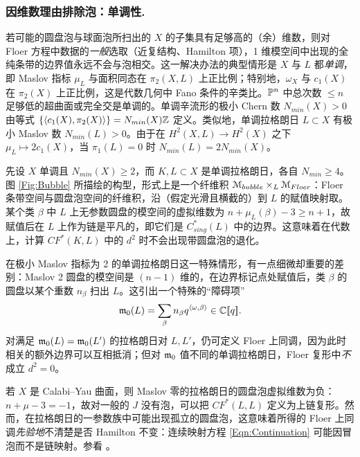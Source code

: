\subsubsection{因维数理由排除泡：单调性.\label{Sec:Monotone}} 若可能的圆盘泡与球面泡所扫出的 $X$ 的子集具有足够高的（余）维数，则对 Floer 方程中数据的\emph{一般}选取（近复结构、Hamilton 项），1 维模空间中出现的全纯条带的边界值永远不会与泡相交。这一解决办法的典型情形是 $X$ 与 $L$ 都\emph{单调}，即 Maslov 指标 $\mu_L$ 与面积同态在 $\pi_2(X,L)$ 上正比例；特别地，$\omega_X$ 与 $c_1(X)$ 在 $\pi_2(X)$ 上正比例，这是代数几何中 Fano 条件的辛类比。$\bP^n$ 中总次数 $\leq n$ 足够低的超曲面或完全交是单调的。单调辛流形的极小 Chern 数 $N_{min}(X)>0$ 由等式 $\{\langle c_1(X), \pi_2(X)\rangle\} = N_{min}(X)\bZ$ 定义。类似地，单调拉格朗日 $L\subset X$ 有极小 Maslov 数 $N_{min}(L)>0$。由于在 $H^2(X,L)\rightarrow H^2(X)$ 之下 $\mu_L \mapsto 2c_1(X)$，当 $\pi_1(L)=0$ 时 $N_{min}(L) = 2N_{min}(X)$。

先设 $X$ 单调且 $N_{min}(X) \geq 2$，而 $K, L\subset X$ 是单调拉格朗日，各自 $N_{min}\geq 4$。图 \ref{Fig:Bubble} 所描绘的构型，形式上是一个纤维积 $\scrM_{bubble} \times_L \scrM_{Floer}$：Floer 条带空间与圆盘泡空间的纤维积，沿（假定光滑且横截的）到 $L$ 的赋值映射取。某个类 $\beta$ 中 $L$ 上无参数圆盘的模空间的虚拟维数为 $n+\mu_L(\beta)-3 \geq n+1$，故赋值后在 $L$ 上作为链是平凡的，即它们是 $C^*_{sing}(L)$ 中的边界。这意味着在代数上，计算 $CF^*(K,L)$ 中的 $d^2$ 时不会出现带圆盘泡的退化。

在极小 Maslov 指标为 2 的单调拉格朗日这一特殊情形，有一点细微却重要的差别：Maslov 2 圆盘的模空间是 $(n-1)$ 维的，在边界标记点处赋值后，类 $\beta$ 的圆盘以某个重数 $n_{\beta}$ 扫出 $L$。这引出一个特殊的“障碍项”
\[
\frak{m}_0(L) = \sum_{\beta} n_{\beta} q^{\langle \omega, \beta\rangle} \in \bC[\![q]\!].
\] 对满足 $\frak{m}_0(L) = \frak{m}_0(L')$ 的拉格朗日对 $L, L'$，仍可定义 Floer 上同调，因为此时相关的额外边界可以互相抵消；但对 $\frak{m}_0$ 值不同的单调拉格朗日，Floer 复形中\emph{不}成立 $d^2=0$。

\begin{Example} \label{Ex:CY} 若 $X$ 是 Calabi–Yau 曲面，则 Maslov 零的拉格朗日的圆盘泡虚拟维数为负：$n+\mu-3 = -1$，故对一般的 $J$ 没有泡，可以把 $CF^*(L,L)$ 定义为上链复形。然而，在拉格朗日的一参数族中可能出现孤立的圆盘泡，这意味着所得的 Floer 上同调\emph{先验地}不清楚是否 Hamilton 不变：连续映射方程 \eqref{Eqn:Continuation} 可能因冒泡而不是链映射。参看 \cite[Section 8]{Seidel:HMSquartic}。
\end{Example}

